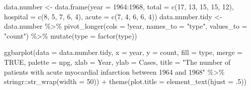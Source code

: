 \documentclass{article}
\newenvironment{Shaded}{\begin{snugshade}}{\end{snugshade}}
\newcommand{\AttributeTok}[1]{\textcolor[rgb]{0.77,0.63,0.00}{#1}}
\newcommand{\ConstantTok}[1]{\textcolor[rgb]{0.00,0.00,0.00}{#1}}
\newcommand{\DecValTok}[1]{\textcolor[rgb]{0.00,0.00,0.81}{#1}}
\newcommand{\FunctionTok}[1]{\textcolor[rgb]{0.00,0.00,0.00}{#1}}
\newcommand{\NormalTok}[1]{#1}
\newcommand{\OtherTok}[1]{\textcolor[rgb]{0.56,0.35,0.01}{#1}}
\newcommand{\SpecialCharTok}[1]{\textcolor[rgb]{0.00,0.00,0.00}{#1}}
\newcommand{\StringTok}[1]{\textcolor[rgb]{0.31,0.60,0.02}{#1}}
\begin{document}
\begin{Shaded}
\begin{Highlighting}[]
\NormalTok{data.number }\OtherTok{\textless{}{-}} \FunctionTok{data.frame}\NormalTok{(}\AttributeTok{year =} \DecValTok{1964}\SpecialCharTok{:}\DecValTok{1968}\NormalTok{, }\AttributeTok{total =} \FunctionTok{c}\NormalTok{(}\DecValTok{17}\NormalTok{, }\DecValTok{13}\NormalTok{, }\DecValTok{15}\NormalTok{, }\DecValTok{15}\NormalTok{, }\DecValTok{12}\NormalTok{),}
                          \AttributeTok{hospital =} \FunctionTok{c}\NormalTok{(}\DecValTok{8}\NormalTok{, }\DecValTok{5}\NormalTok{, }\DecValTok{7}\NormalTok{, }\DecValTok{6}\NormalTok{, }\DecValTok{4}\NormalTok{), }\AttributeTok{acute =} \FunctionTok{c}\NormalTok{(}\DecValTok{7}\NormalTok{, }\DecValTok{4}\NormalTok{, }\DecValTok{6}\NormalTok{, }\DecValTok{6}\NormalTok{, }\DecValTok{4}\NormalTok{))}
\NormalTok{data.number.tidy }\OtherTok{\textless{}{-}}\NormalTok{ data.number }\SpecialCharTok{\%\textgreater{}\%}
    \FunctionTok{pivot\_longer}\NormalTok{(}\AttributeTok{cols =} \SpecialCharTok{!}\NormalTok{year, }\AttributeTok{names\_to =} \StringTok{"type"}\NormalTok{, }\AttributeTok{values\_to =} \StringTok{"count"}\NormalTok{) }\SpecialCharTok{\%\textgreater{}\%}
    \FunctionTok{mutate}\NormalTok{(}\AttributeTok{type =} \FunctionTok{factor}\NormalTok{(type))}

\FunctionTok{ggbarplot}\NormalTok{(}\AttributeTok{data =}\NormalTok{ data.number.tidy, }\AttributeTok{x =} \StringTok{\textquotesingle{}year\textquotesingle{}}\NormalTok{, }\AttributeTok{y =} \StringTok{\textquotesingle{}count\textquotesingle{}}\NormalTok{, }\AttributeTok{fill =} \StringTok{\textquotesingle{}type\textquotesingle{}}\NormalTok{, }\AttributeTok{merge =} \ConstantTok{TRUE}\NormalTok{,}
          \AttributeTok{palette =} \StringTok{\textquotesingle{}npg\textquotesingle{}}\NormalTok{, }\AttributeTok{xlab =} \StringTok{\textquotesingle{}Year\textquotesingle{}}\NormalTok{, }\AttributeTok{ylab =} \StringTok{\textquotesingle{}Cases\textquotesingle{}}\NormalTok{, }
          \AttributeTok{title =} \StringTok{"The number of patients with acute myocardial }
\StringTok{          infarction between 1964 and 1968"} \SpecialCharTok{\%\textgreater{}\%} 
\NormalTok{            stringr}\SpecialCharTok{::}\FunctionTok{str\_wrap}\NormalTok{(}\AttributeTok{width =} \DecValTok{50}\NormalTok{)) }\SpecialCharTok{+} \FunctionTok{theme}\NormalTok{(}\AttributeTok{plot.title =} \FunctionTok{element\_text}\NormalTok{(}\AttributeTok{hjust =}\NormalTok{ .}\DecValTok{5}\NormalTok{))}
\end{Highlighting}
\end{Shaded}
\end{document}
